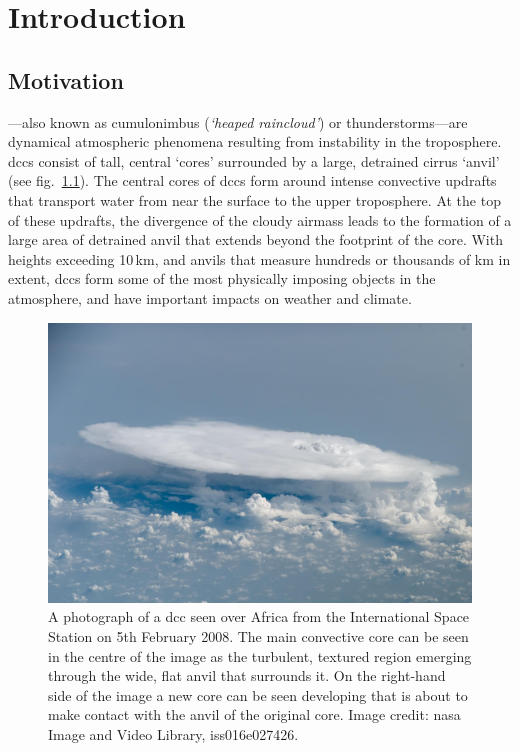 \chapter{Introduction} \label{chp:introduction}

\section{Motivation}

---also known as cumulonimbus (\textit{`heaped raincloud'}) or thunderstorms---are dynamical atmospheric phenomena resulting from instability in the troposphere.
\acrshort{dcc}s consist of tall, central `cores' surrounded by a large, detrained cirrus `anvil' (see fig.~\ref{fig:cb_photo}).
The central cores of \acrshort{dcc}s form around intense convective updrafts that transport water from near the surface to the upper troposphere.
At the top of these updrafts, the divergence of the cloudy airmass leads to the formation of a large area of detrained anvil that extends beyond the footprint of the core.
With heights exceeding 10\,\unit{km}, and anvils that measure hundreds or thousands of km in extent, \acrshort{dcc}s form some of the most physically imposing objects in the atmosphere, and have important impacts on weather and climate.

\begin{figure}[tp]
    \centering
    \includegraphics[width=\textwidth]{figures/cumulonimbus_nasa.jpg}
    \caption[
    A photograph of a \acrshort{dcc} seen over Africa from the ISS
    ]{
    A photograph of a \acrshort{dcc} seen over Africa from the International Space Station on 5th February 2008. The main convective core can be seen in the centre of the image as the turbulent, textured region emerging through the wide, flat anvil that surrounds it. On the right-hand side of the image a new core can be seen developing that is about to make contact with the anvil of the original core. Image credit: \acrshort{nasa} Image and Video Library, iss016e027426.
    }
    \label{fig:cb_photo}
\end{figure}

